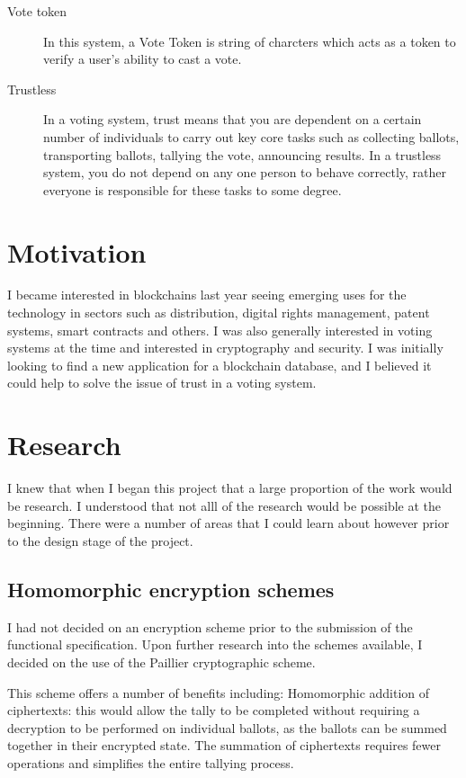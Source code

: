 \documentclass[a4paper,12pt]{article}
\begin{document}
\begin{description}
    \item[Vote token]
        In this system, a Vote Token is string of charcters which acts as a token to verify a user's ability to cast a vote.

    \item[Trustless]
        In a voting system, trust means that you are dependent on a certain number of individuals to carry out key core tasks such as collecting ballots, transporting ballots, tallying the vote, announcing results. In a trustless system, you do not depend on any one person to behave correctly, rather everyone is responsible for these tasks to some degree.
\end{description}

\section{Motivation}
I became interested in blockchains last year seeing emerging uses for the technology in sectors such as distribution, digital rights management, patent systems, smart contracts and others. I was also generally interested in voting systems at the time and interested in cryptography and security. I was initially looking to find a new application for a blockchain database, and I believed it could help to solve the issue of trust in a voting system.

\section{Research}
I knew that when I began this project that a large proportion of the work would be research. I understood that not alll of the research would be possible at the beginning. There were a number of areas that I could learn about however prior to the design stage of the project.
\subsection{Homomorphic encryption schemes}
I had not decided on an encryption scheme prior to the submission of the functional specification. Upon further research into the schemes available, I decided on the use of the Paillier cryptographic scheme.

This scheme offers a number of benefits including:
Homomorphic addition of ciphertexts: this would allow the tally to be completed without requiring a decryption to be performed on individual ballots, as the ballots can be summed together in their encrypted state. The summation of ciphertexts requires fewer operations and simplifies the entire tallying process.
\end{document}
